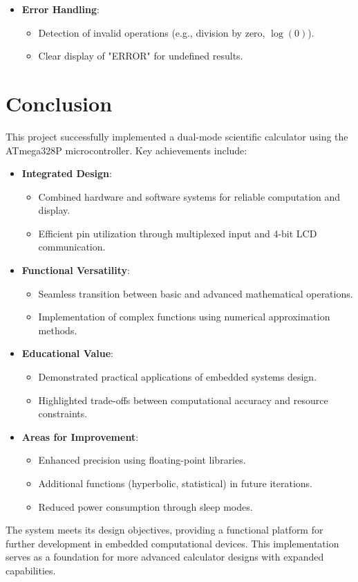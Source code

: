 \documentclass[journal]{IEEEtran}
\begin{document}
\begin{itemize}
    \item \textbf{Error Handling}:
    \begin{itemize}
        \item Detection of invalid operations (e.g., division by zero, $\log(0)$).
        \item Clear display of "ERROR" for undefined results.
    \end{itemize}
\end{itemize}

\section{Conclusion}
This project successfully implemented a dual-mode scientific calculator using the ATmega328P microcontroller. Key achievements include:

\begin{itemize}
    \item \textbf{Integrated Design}:
    \begin{itemize}
        \item Combined hardware and software systems for reliable computation and display.
        \item Efficient pin utilization through multiplexed input and 4-bit LCD communication.
    \end{itemize}
    
    \item \textbf{Functional Versatility}:
    \begin{itemize}
        \item Seamless transition between basic and advanced mathematical operations.
        \item Implementation of complex functions using numerical approximation methods.
    \end{itemize}
    
    \item \textbf{Educational Value}:
    \begin{itemize}
        \item Demonstrated practical applications of embedded systems design.
        \item Highlighted trade-offs between computational accuracy and resource constraints.
    \end{itemize}
    
    \item \textbf{Areas for Improvement}:
    \begin{itemize}
        \item Enhanced precision using floating-point libraries.
        \item Additional functions (hyperbolic, statistical) in future iterations.
        \item Reduced power consumption through sleep modes.
    \end{itemize}
\end{itemize}

The system meets its design objectives, providing a functional platform for further development in embedded computational devices. This implementation serves as a foundation for more advanced calculator designs with expanded capabilities.
\end{document}

